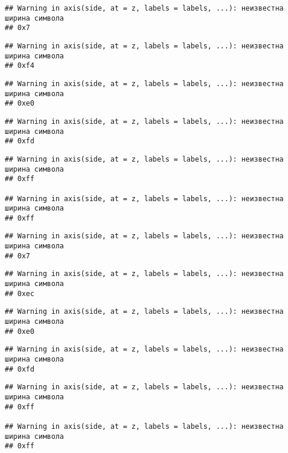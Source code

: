 \documentclass[
]{article}
\begin{document}
\begin{verbatim}
## Warning in axis(side, at = z, labels = labels, ...): неизвестна ширина символа
## 0x7
\end{verbatim}

\begin{verbatim}
## Warning in axis(side, at = z, labels = labels, ...): неизвестна ширина символа
## 0xf4
\end{verbatim}

\begin{verbatim}
## Warning in axis(side, at = z, labels = labels, ...): неизвестна ширина символа
## 0xe0
\end{verbatim}

\begin{verbatim}
## Warning in axis(side, at = z, labels = labels, ...): неизвестна ширина символа
## 0xfd
\end{verbatim}

\begin{verbatim}
## Warning in axis(side, at = z, labels = labels, ...): неизвестна ширина символа
## 0xff

## Warning in axis(side, at = z, labels = labels, ...): неизвестна ширина символа
## 0xff
\end{verbatim}

\begin{verbatim}
## Warning in axis(side, at = z, labels = labels, ...): неизвестна ширина символа
## 0x7
\end{verbatim}

\begin{verbatim}
## Warning in axis(side, at = z, labels = labels, ...): неизвестна ширина символа
## 0xec
\end{verbatim}

\begin{verbatim}
## Warning in axis(side, at = z, labels = labels, ...): неизвестна ширина символа
## 0xe0
\end{verbatim}

\begin{verbatim}
## Warning in axis(side, at = z, labels = labels, ...): неизвестна ширина символа
## 0xfd
\end{verbatim}

\begin{verbatim}
## Warning in axis(side, at = z, labels = labels, ...): неизвестна ширина символа
## 0xff

## Warning in axis(side, at = z, labels = labels, ...): неизвестна ширина символа
## 0xff
\end{verbatim}
\end{document}
